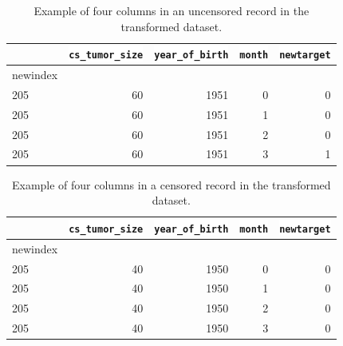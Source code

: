 \documentclass[10pt,letterpaper]{article}
\newcommand{\codewhite}[1]{\colorbox{white}{\texttt{#1}}}
\begin{document}
\begin{table}[!ht]
\begin{adjustwidth}{-2.25in}{0in} %
\caption{\label{tab:transformeddead} Example of four columns in an uncensored record in the transformed dataset.}
\begin{tabular}{lrrrr}
\toprule
{} &  \codewhite{cs\_tumor\_size} &  \codewhite{year\_of\_birth} &  \codewhite{month} &  \codewhite{newtarget} \\
\midrule
newindex &                &                &        &            \\
205      &             60 &           1951 &      0 &          0 \\
205      &             60 &           1951 &      1 &          0 \\
205      &             60 &           1951 &      2 &          0 \\
205      &             60 &           1951 &      3 &          1 \\
\bottomrule
\end{tabular}
\end{adjustwidth}
\end{table}


\begin{table}[tbp]
\begin{adjustwidth}{-2.25in}{0in} %
\caption{\label{tab:transformedalive} Example of four columns in a censored record in the transformed dataset.}
\begin{tabular}{lrrrr}
\toprule
{} &  \codewhite{cs\_tumor\_size} &  \codewhite{year\_of\_birth} &  \codewhite{month} &  \codewhite{newtarget} \\
\midrule
newindex &                &                &        &            \\
205      &             40 &           1950 &      0 &          0 \\
205      &             40 &           1950 &      1 &          0 \\
205      &             40 &           1950 &      2 &          0 \\
205      &             40 &           1950 &      3 &          0 \\
\bottomrule
\end{tabular}
\end{adjustwidth}
\end{table}
\end{document}

